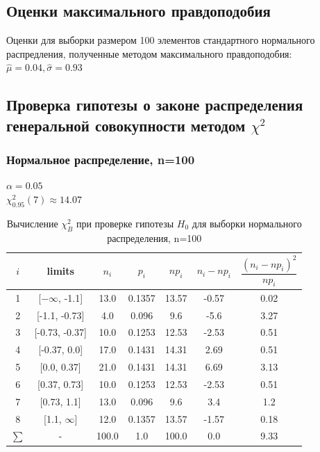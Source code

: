 \subsection{Оценки максимального правдоподобия}

Оценки для выборки размером 100 элементов стандартного нормального распредления, полученные методом максимального правдоподобия: \\
$\hat{\mu} = 0.04, \hat{\sigma} = 0.93 $

\subsection{Проверка гипотезы о законе распределения генеральной совокупности методом $\chi^2$ }

\subsubsection{Нормальное распределение, n=100}

$\alpha = 0.05$ \\
$\chi^{2}_{0.95}(7) \approx 14.07$ \\

\begin{table}[H]
	\begin{center}
		\begin{tabular}{|c|c|c|c|c|c|c|}
			\hline
			$i$ & limits & $n_i$ & $p_i$ & $np_i$ & $n_i - np_i$ & $\dfrac{(n_i-np_i)^2}{np_i}$ \\
			\hline
			1 & [$-\infty$, -1.1] & 13.0 & 0.1357 & 13.57 & -0.57 & 0.02 \\
			2 & [-1.1, -0.73] & 4.0 & 0.096 & 9.6 & -5.6 & 3.27 \\
			3 & [-0.73, -0.37] & 10.0 & 0.1253 & 12.53 & -2.53 & 0.51 \\
			4 & [-0.37, 0.0] & 17.0 & 0.1431 & 14.31 & 2.69 & 0.51 \\
			5 & [0.0, 0.37] & 21.0 & 0.1431 & 14.31 & 6.69 & 3.13 \\
			6 & [0.37, 0.73] & 10.0 & 0.1253 & 12.53 & -2.53 & 0.51 \\
			7 & [0.73, 1.1] & 13.0 & 0.096 & 9.6 & 3.4 & 1.2 \\
			8 & [1.1, $\infty$] & 12.0 & 0.1357 & 13.57 & -1.57 & 0.18 \\
			\hline
			$\sum$ & - & 100.0 & 1.0 & 100.0 & 0.0 & 9.33\\
			\hline
		\end{tabular}
	\end{center}
	\caption{Вычисление $\chi_{B}^2$ при проверке гипотезы $H_0$ для выборки нормального распределения, n=100}
\end{table} 

